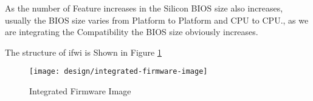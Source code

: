 As the number of Feature increases in the Silicon BIOS size also increases, usually the BIOS size varies from Platform to Platform and CPU to CPU., as we are integrating the Compatibility the BIOS size obviously increases. 

The structure of \gls{ifwi} is Shown in Figure \ref{fig:design-integrated-firmware-image}

\begin{figure}[h]
	\centering
	\texttt{[image: design/integrated-firmware-image]}
	\caption{Integrated Firmware Image}\label{fig:design-integrated-firmware-image}
\end{figure}


